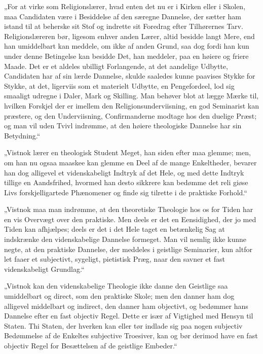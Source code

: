 \documentclass[12pt,a4paper]{book}
\newcommand{\opage}[1]{\marginnote{\footnotesize\textit{[#1]}}}
\begin{document}
„For at virke som Religionslærer, hvad enten det nu er i Kirken eller i
Skolen, maa Candidaten være i Besiddelse af den særegne Dannelse, der
sætter ham istand til at beherske sit Stof og indrette sit Foredrag efter
Tilhørernes Tarv. Religionslæreren bør, ligesom enhver anden Lærer, altid
besidde langt Mere, end han umiddelbart kan meddele, om ikke af anden
Grund, saa dog fordi han kun under denne Betingelse kan besidde Det, han
meddeler, paa en høiere og friere Maade. Det er et aldeles ubilligt
Forlangende, at det aandelige Udbytte, Candidaten har af sin lærde
Dannelse, skulde saaledes kunne paavises Stykke for Stykke, at det,
ligerviis som et materielt Udbytte, en Pengefordeel, lod sig smaaligt
udregne i Daler, Mark og Skilling. Man behøver blot at lægge Mærke til,
hvilken Forskjel der er imellem den Religionsunderviisning, en god
Seminarist kan præstere, og den Underviisning, Confirmanderne modtage hos
den duelige Præst; og man vil uden Tvivl indrømme, at den høiere
theologiske Dannelse har sin Betydning.“

„Vistnok lærer en theologisk Student Meget, han siden efter maa glemme;
men, om han nu ogsaa maaskee kan glemme en Deel af de mange Enkeltheder,
bevarer han dog alligevel et videnskabeligt Indtryk af det Hele, og med
dette Indtryk tillige en Aandsfrihed, hvormed han desto sikkrere kan
bedømme det reli\-%
\opage{140}giøse Livs forskjelligartede Phænomener og finde sig tilrette i de
praktiske Forhold.“

„Vistnok maa man indrømme, at den theoretiske Theologie hos os for Tiden
har en vis Overvægt over den praktiske. Men deels er det en Eensidighed,
der jo med Tiden kan afhjælpes; deels er det i det Hele taget en betænkelig
Sag at indskrænke den videnskabelige Dannelse formeget. Man vil nemlig ikke
kunne negte, at den praktiske Dannelse, der meddeles i geistlige
Seminarier, kun altfor let faaer et subjectivt, sygeligt, pietistisk Præg,
naar den savner et fast videnskabeligt Grundlag.“

„Vistnok kan den videnskabelige Theologie ikke danne den Geistlige saa
umiddelbart og direct, som den praktiske Skole; men den danner ham dog
alligevel middelbart og indirect, den danner ham objectivt, og bedømmer
hans Dannelse efter en fast objectiv Regel. Dette er især af Vigtighed med
Hensyn til Staten. Thi Staten, der hverken kan eller tør indlade sig paa
nogen subjectiv Bedømmelse af de Enkeltes subjective Troesiver, kan og bør
derimod have en fast objectiv Regel for Besættelsen af de geistlige
Embeder.“
\end{document}

